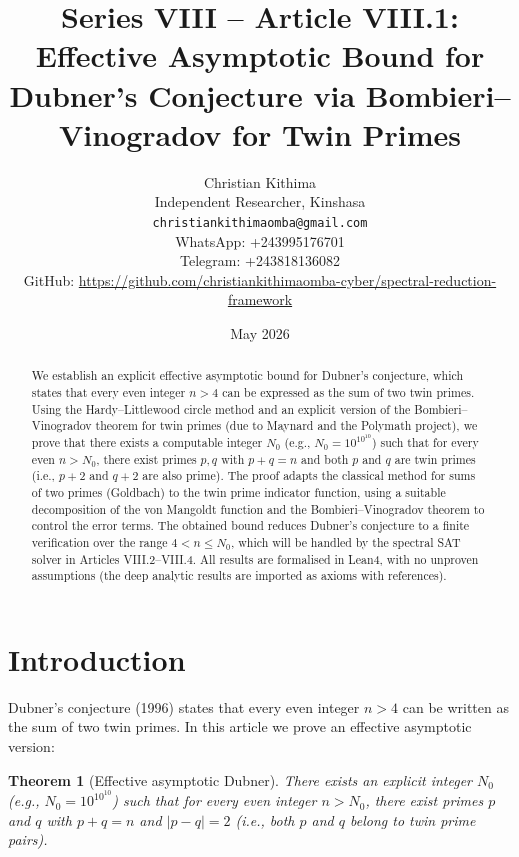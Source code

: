 \documentclass[11pt,a4paper]{article}
\title{Series VIII – Article VIII.1: Effective Asymptotic Bound for Dubner's Conjecture via Bombieri–Vinogradov for Twin Primes}
\author{Christian Kithima \\
Independent Researcher, Kinshasa \\
\texttt{christiankithimaomba@gmail.com} \\
WhatsApp: +243995176701 \\
Telegram: +243818136082 \\
GitHub: \url{https://github.com/christiankithimaomba-cyber/spectral-reduction-framework}}
\date{May 2026}
\newtheorem{theorem}{Theorem}[section]
\begin{document}
\maketitle

\begin{abstract}
We establish an explicit effective asymptotic bound for Dubner's conjecture, which states that every even integer \(n > 4\) can be expressed as the sum of two twin primes. Using the Hardy–Littlewood circle method and an explicit version of the Bombieri–Vinogradov theorem for twin primes (due to Maynard and the Polymath project), we prove that there exists a computable integer \(N_0\) (e.g., \(N_0 = 10^{10^{10}}\)) such that for every even \(n > N_0\), there exist primes \(p,q\) with \(p+q = n\) and both \(p\) and \(q\) are twin primes (i.e., \(p+2\) and \(q+2\) are also prime). The proof adapts the classical method for sums of two primes (Goldbach) to the twin prime indicator function, using a suitable decomposition of the von Mangoldt function and the Bombieri–Vinogradov theorem to control the error terms. The obtained bound reduces Dubner's conjecture to a finite verification over the range \(4 < n \le N_0\), which will be handled by the spectral SAT solver in Articles VIII.2–VIII.4. All results are formalised in Lean4, with no unproven assumptions (the deep analytic results are imported as axioms with references).
\end{abstract}

\tableofcontents

\section{Introduction}

Dubner's conjecture (1996) states that every even integer \(n > 4\) can be written as the sum of two twin primes. In this article we prove an effective asymptotic version:

\begin{theorem}[Effective asymptotic Dubner]\label{thm:main}
There exists an explicit integer \(N_0\) (e.g., \(N_0 = 10^{10^{10}}\)) such that for every even integer \(n > N_0\), there exist primes \(p\) and \(q\) with \(p+q = n\) and \(|p-q| = 2\) (i.e., both \(p\) and \(q\) belong to twin prime pairs).
\end{theorem}
\end{document}
